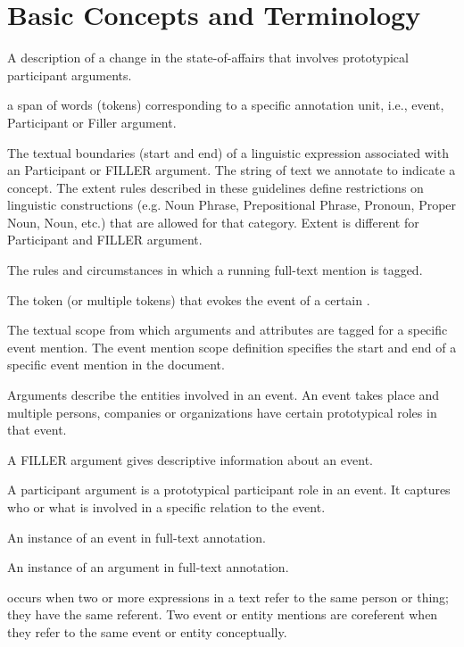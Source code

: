 \section{Basic Concepts and Terminology}
\begin{description}[noitemsep]
    \item[Event] A description of a change in the state-of-affairs that involves prototypical participant arguments.
    \item[Mention] a span of words (tokens) corresponding to a specific annotation unit, i.e., event, Participant or Filler argument.
    \item[Extent] The textual boundaries (start and end) of a linguistic expression associated with an Participant or FILLER argument.
    The string of text we annotate to indicate a concept.
    The extent rules described in these guidelines define restrictions on linguistic constructions (e.g. Noun Phrase, Prepositional Phrase, Pronoun, Proper Noun, Noun, etc.) that are allowed for that category.
    Extent is different for Participant and FILLER argument.
    \item[Taggability] The rules and circumstances in which a running full-text mention is tagged.
    \item[Event trigger] The token (or multiple tokens) that evokes the event of a certain .
    \item[Event mention scope] The textual scope from which arguments and attributes are tagged for a specific event mention.
    The event mention scope definition specifies the start and end of a specific event mention in the document.
    \item[Event argument] Arguments describe the entities involved in an event. An event takes place and multiple persons, companies or organizations have certain prototypical roles in that event.
    \item[FILLER argument] A FILLER argument gives descriptive information about an event. 
    \item[Participant argument] A participant argument is a prototypical participant role in an event. It captures who or what is involved in a specific relation to the event. 
    \item[Event mention] An instance of an event in full-text annotation.
    \item[Argument mention] An instance of an argument in full-text annotation.
    \item[Coreference] occurs when two or more expressions in a text refer to the same person or thing; they have the same referent. Two event or entity mentions are coreferent when they refer to the same event or entity conceptually.
\end{description}

